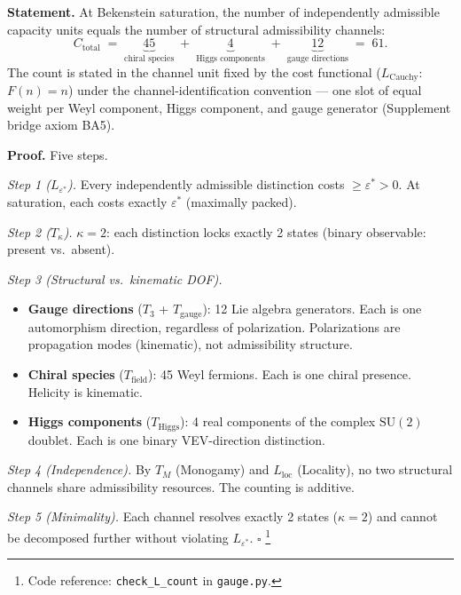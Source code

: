 \documentclass[11pt]{article}
\newenvironment{varlist}{\begin{itemize}[nosep,leftmargin=2em]}{\end{itemize}}
\newcommand{\coderef}[2]{\footnote{Code reference: \texttt{#1} in \texttt{#2}.}}
\newcommand{\SU}{\mathrm{SU}}
\begin{document}
\begin{tcolorbox}[apfbox, title={Lemma $L_{\mathrm{count}}$ (Capacity Counting)}]
\textbf{Statement.}  At Bekenstein saturation, the number of independently admissible capacity units equals the number of structural admissibility channels:
\begin{equation}
C_{\mathrm{total}} \;=\; \underbrace{45}_{\text{chiral species}} \;+\; \underbrace{4}_{\text{Higgs components}} \;+\; \underbrace{12}_{\text{gauge directions}} \;=\; 61.
\label{eq:ctotal}
\end{equation}
The count is stated in the channel unit fixed by the cost functional
($L_{\mathrm{Cauchy}}$: $F(n) = n$) under the channel-identification
convention --- one slot of equal weight per Weyl component, Higgs
component, and gauge generator (Supplement bridge axiom BA5).

\smallskip\noindent\textbf{Proof.}  Five steps.

\textit{Step 1 ($L_{\varepsilon^*}$).}  Every independently admissible distinction costs $\ge \varepsilon^* > 0$.  At saturation, each costs exactly $\varepsilon^*$ (maximally packed).

\textit{Step 2 ($T_\kappa$).}  $\kappa = 2$: each distinction locks exactly 2 states (binary observable: present vs.\ absent).

\textit{Step 3 (Structural vs.\ kinematic DOF).}
\begin{varlist}
\item \textbf{Gauge directions} ($T_3$ + $T_{\mathrm{gauge}}$): 12 Lie algebra generators.  Each is one automorphism direction, regardless of polarization.  Polarizations are propagation modes (kinematic), not admissibility structure.
\item \textbf{Chiral species} ($T_{\mathrm{field}}$): 45 Weyl fermions.  Each is one chiral presence.  Helicity is kinematic.
\item \textbf{Higgs components} ($T_{\mathrm{Higgs}}$): 4 real components of the complex $\SU(2)$ doublet.  Each is one binary VEV-direction distinction.
\end{varlist}

\textit{Step 4 (Independence).}  By $T_M$ (Monogamy) and $L_{\mathrm{loc}}$ (Locality), no two structural channels share admissibility resources.  The counting is additive.

\textit{Step 5 (Minimality).}  Each channel resolves exactly 2 states ($\kappa = 2$) and cannot be decomposed further without violating $L_{\varepsilon^*}$.  $\square$
\coderef{check\_L\_count}{gauge.py}
\end{tcolorbox}
\end{document}
